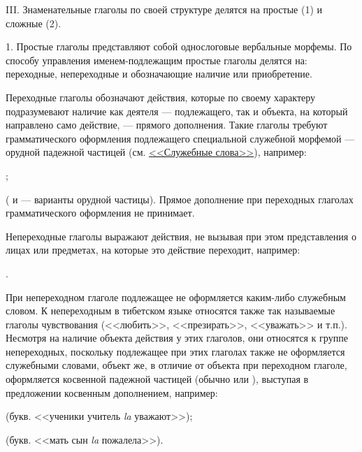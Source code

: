 III. Знаменательные глаголы по своей структуре делятся на простые (1) и сложные (2).

1. Простые глаголы представляют собой однослоговые вербальные морфемы. По способу управления именем-подлежащим простые глаголы делятся на: переходные, непереходные и обозначающие наличие или приобретение.

Переходные глаголы обозначают действия, которые по своему характеру подразумевают наличие как деятеля --- подлежащего, так и объекта, на который направлено само действие, --- прямого дополнения. Такие глаголы требуют грамматического оформления подлежащего специальной служебной морфемой --- орудной падежной частицей (см. \hyperref[sec:ss]{<<Служебные слова>>}), например:
\begin{prfsample}
	\item {};
	\item {}
\end{prfsample}
( и  --- варианты орудной частицы). Прямое дополнение при переходных глаголах грамматического оформления не принимает.

Непереходные глаголы выражают действия, не вызывая при этом представления о лицах или предметах, на которые это действие переходит, например:
\begin{prfsample}
	\item {}.
\end{prfsample}
При непереходном глаголе подлежащее не оформляется каким-либо служебным словом. К непереходным в тибетском языке относятся также так называемые глаголы чувствования (<<любить>>, <<презирать>>, <<уважать>> и т.п.). Несмотря на наличие объекта действия у этих глаголов, они относятся к группе непереходных, поскольку подлежащее при этих глаголах также не оформляется служебными словами, объект же, в отличие от объекта при переходном глаголе, оформляется косвенной падежной частицей (обычно  или ), выступая в предложении косвенным дополнением, например:
\begin{prfsample}
	\item {} (букв. <<ученики учитель \emph{la} уважают>>);
	\item {} (букв. <<мать сын \emph{la} пожалела>>).
\end{prfsample}

